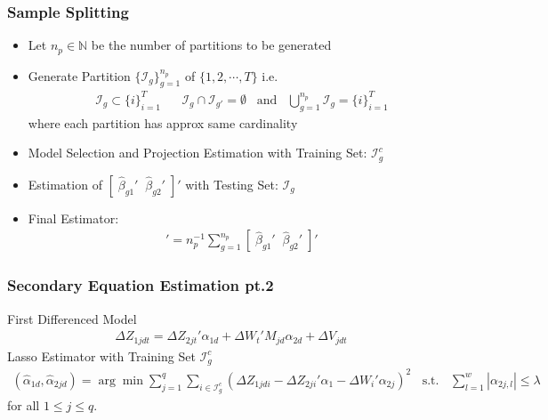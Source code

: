 \documentclass[9pt]{beamer}
\begin{document}
\begin{frame} 
\frametitle{Sample Splitting} 

\begin{itemize}  \addtolength{\itemsep}{\baselineskip}
	\item Let $n_p \in \mathbb{N}$ be the number of partitions to be generated
	\item Generate Partition $\{\mathcal{I}_g\}_{g=1}^{n_p}$ of $\{1,2,\cdots,T\}$ i.e.
	\begin{align*}
	\mathcal{I}_g \subset \{i\}_{i=1}^{T} \;\;\;\;\;\; \mathcal{I}_g \cap \mathcal{I}_{g'} = \emptyset \;\;\; \text{and} \;\;\;  \bigcup_{g=1}^{n_p} \mathcal{I}_g = \{i\}_{i=1}^{T}
	\end{align*}
where each partition has approx same cardinality
       \item Model Selection and Projection Estimation with Training Set: $\mathcal{I}^c_g$
       \item Estimation of $[ \; \hat{\beta} _{g1}' \;\; \hat{\beta}_{g2}' \;]'$ with Testing Set: $\mathcal{I}_g$  
       \item Final Estimator:
       \begin{align*}
        [ \; \hat{\beta} _{1}' \;\; \hat{\beta}_{2}' \;]' = n_p^{-1} \sum_{g=1}^{n_p} [ \; \hat{\beta} _{g1}' \;\; \hat{\beta}_{g2}' \;]'
       \end{align*}
 
\end{itemize} 

\end{frame}



\begin{frame} 
\frametitle{Secondary Equation Estimation pt.2} 

First Differenced Model
\begin{align*} 
\Delta Z_{1jdt} =\Delta Z_{2jt}' \alpha_{1d} + \Delta W_{t}'M_{jd} \alpha_{2d} + \Delta V_{jdt}
\end{align*}
Lasso Estimator with Training Set $\mathcal{I}^c_g$
\begin{align*} 
(\hat{\alpha}_{1d},\hat{\alpha}_{2jd})  = \arg \min \sum_{j=1}^q\sum_{i \in \mathcal{I}^c_g}\left( \Delta Z_{1jdi} -  \Delta Z_{2ji}'\alpha_{1} - \Delta W_{i}'\alpha_{2j} \right)^2 \;\; \text{ s.t. } \;\; \sum_{l=1}^w|\alpha_{2j,l}| \leq \lambda 
\end{align*}
for all $1 \leq j \leq q$.  

\end{frame}
\end{document}
